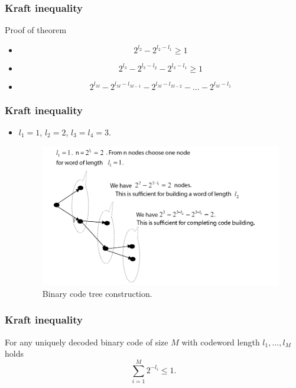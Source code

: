 \documentclass[14pt]{beamer}
\begin{document}
\begin{frame}
\frametitle{Kraft inequality}
Proof of theorem
\begin{itemize}    

    \item 
    \[
    2^{l_2 } - 2^{l_2 - l_1 } \ge 1
    \]
    
    \item
    \[
    2^{l_3 } - 2^{l_3 - l_2 } - 2^{l_3 - l_1 } \ge 1
    \]
    
    \item
    \[
    2^{l_M } - 2^{l_M - l_{M - 1} } - 2^{l_M - l_{M - 2} } - ... - 2^{l_M - l_1}
    \]


\end{itemize}
\end{frame}



\begin{frame}
\frametitle{Kraft inequality}
\begin{itemize}

    \item $l_1 = 1$, $l_2 = 2$, $l_3 = l_4 = 3$. 
    \begin{figure}[ht]
    \begin{minipage}{1.0\linewidth}
    \includegraphics[width=1.0\textwidth]{fig2_3.png}
    \caption{Binary code tree construction.} \label{Kraft_en}
    \end{minipage}
    \end{figure}

\end{itemize}
\end{frame}



\begin{frame}
\frametitle{Kraft inequality}

    \begin{theorem} For any uniquely decoded binary code of size $M$ with codeword length $l_1 ,...,l_M $ holds
    \begin{equation}
    \label{Kraft2} \sum\limits_{i = 1}^M {2^{ - l_i } \le 1} .
    \end{equation}
    \end{theorem}
    
\end{frame}
\end{document}
